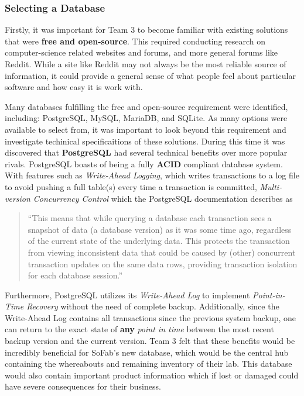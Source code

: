 \documentclass{article}
\begin{document}
\subsubsection{Selecting a Database}
Firstly, it was important for Team 3 to become familiar with existing solutions that were \textbf{free and open-source}. 
This required conducting research on computer-science related websites and forums, and more general forums like 
Reddit. While a site like Reddit may not always be the most reliable source of information, it could provide a general sense of what 
people feel about particular software and how easy it is work with. 

Many databases fulfilling the free and open-source requirement were identified, including: PostgreSQL, MySQL, MariaDB, and SQLite. As 
many options were available to select from, it was important to look beyond this requirement and investigate techinical specificaitions
of these solutions. During this time it was discovered that \textbf{PostgreSQL} had several technical benefits over more popular 
rivals. PostgreSQL boasts of being a fully \textbf{ACID} compliant database system. With features such as \textit{Write-Ahead Logging},
which writes transactions to a log file to avoid pushing a full table(s) every time a transaction is committed, \textit{Multi-version 
Concurrency Control} which the PostgreSQL documentation describes as 

\begin{quote}``This means that while querying a database each transaction 
sees a snapshot of data (a database version) as it was some time ago, regardless of the current state of the underlying data. 
This protects the transaction from viewing inconsistent data that could be caused by (other) concurrent transaction updates on the 
same data rows, providing transaction isolation for each database session.''\cite{postgresql-mvcc}
\end{quote} 

Furthermore, PostgreSQL utilizes its \textit{Write-Ahead Log} to implement \textit{Point-in-Time Recovery} without the need of 
complete backup. Additionally, since the Write-Ahead Log contains all transactions since the previous system backup, one can 
return to the exact state of \textbf{any} \textit{point in time} between the most recent backup version and the current version. 
Team 3 felt that these benefits would be incredibly beneficial for SoFab's new database, which would be the central hub containing 
the whereabouts and remaining inventory of their lab. This database would also contain important product information which if lost 
or damaged could have severe consequences for their business. 
\end{document}
